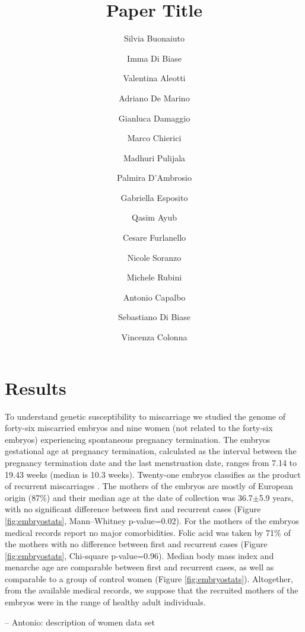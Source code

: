 \documentclass[fleqn,10pt]{wlscirep}
\title{Paper Title}
\author[1+]{Silvia Buonaiuto}
\author[2+]{Imma Di Biase}
\author[3+]{Valentina Aleotti}
\author[4]{Adriano De Marino}
\author[1]{Gianluca Damaggio}
\author[5]{Marco Chierici}
\author[6]{Madhuri Pulijala}
\author[2]{Palmira D’Ambrosio}
\author[2]{Gabriella Esposito}
\author[6]{Qasim Ayub}
\author[5]{Cesare Furlanello}
\author[7]{Nicole Soranzo}
\author[3]{Michele Rubini}
\author[4]{Antonio Capalbo}
\author[2]{Sebastiano Di Biase}
\author[1*]{Vincenza Colonna}
\affil[1]{Affiliation, department, city, postcode, country}
\affil[2]{Affiliation, department, city, postcode, country}
\affil[*]{Correspondence: vincenza.colonna@igb.cnr.it (V.C.)}
\affil[+]{these authors contributed equally to this work}
\begin{document}
\flushbottom
\maketitle
%
%
%

\section*{Results}
To understand genetic susceptibility to miscarriage we studied the genome of forty-six miscarried embryos and nine women (not related to the forty-six embryos) experiencing spontaneous pregnancy termination. The embryos gestational age at pregnancy termination, calculated as the interval between the pregnancy termination date and the last menstruation date, ranges from 7.14 to 19.43 weeks (median is 10.3 weeks). Twenty-one embryos classifies as the product of recurrent miscarriages \cite{eshre2018eshre}. The mothers of the embryos are mostly of European origin (87\%) and their median age at the date of collection was 36.7$\pm$5.9 years, with no significant difference between first and recurrent cases (Figure \ref{fig:embryostats}, Mann–Whitney p-value=0.02). For the mothers of the embryos medical records report no major comorbidities. Folic acid was taken by 71\% of the mothers with no difference between first and recurrent cases (Figure \ref{fig:embryostats}, Chi-square p-value=0.96). Median body mass index and menarche age are comparable between first and recurrent cases, as well as comparable to a group of control women (Figure \ref{fig:embryostats}). Altogether, from the available medical records, we suppose that the recruited mothers of the embryos were in the range of healthy adult individuals.

{\color{blue}-- Antonio: description of women data set }
\end{document}
